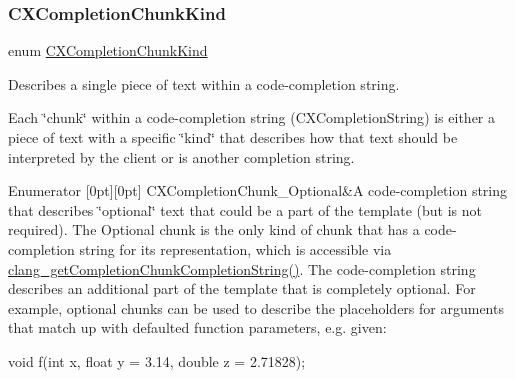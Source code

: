 \subsubsection{\texorpdfstring{C\+X\+Completion\+Chunk\+Kind}{CXCompletionChunkKind}}
{\footnotesize\ttfamily enum \mbox{\hyperlink{group__CINDEX__CODE__COMPLET_ga82570056548565efdd6fc74e57e75bbd}{C\+X\+Completion\+Chunk\+Kind}}}



Describes a single piece of text within a code-\/completion string. 

Each \char`\"{}chunk\char`\"{} within a code-\/completion string ({\ttfamily C\+X\+Completion\+String}) is either a piece of text with a specific \char`\"{}kind\char`\"{} that describes how that text should be interpreted by the client or is another completion string. \begin{DoxyEnumFields}{Enumerator}
[0pt][0pt]{}\mbox{\label{group__CINDEX__CODE__COMPLET_gga82570056548565efdd6fc74e57e75bbdacb5795145d840263ac0f4ce7292c917f}} 
C\+X\+Completion\+Chunk\+\_\+\+Optional&A code-\/completion string that describes \char`\"{}optional\char`\"{} text that could be a part of the template (but is not required). The Optional chunk is the only kind of chunk that has a code-\/completion string for its representation, which is accessible via {\ttfamily \mbox{\hyperlink{group__CINDEX__CODE__COMPLET_ga3063e36e81b3e14809f87bdc841a3a9d}{clang\+\_\+get\+Completion\+Chunk\+Completion\+String()}}}. The code-\/completion string describes an additional part of the template that is completely optional. For example, optional chunks can be used to describe the placeholders for arguments that match up with defaulted function parameters, e.\+g. given\+:


\begin{DoxyCode}
void f(int x, float y = 3.14, double z = 2.71828);
\end{DoxyCode}



\end{DoxyEnumFields}
